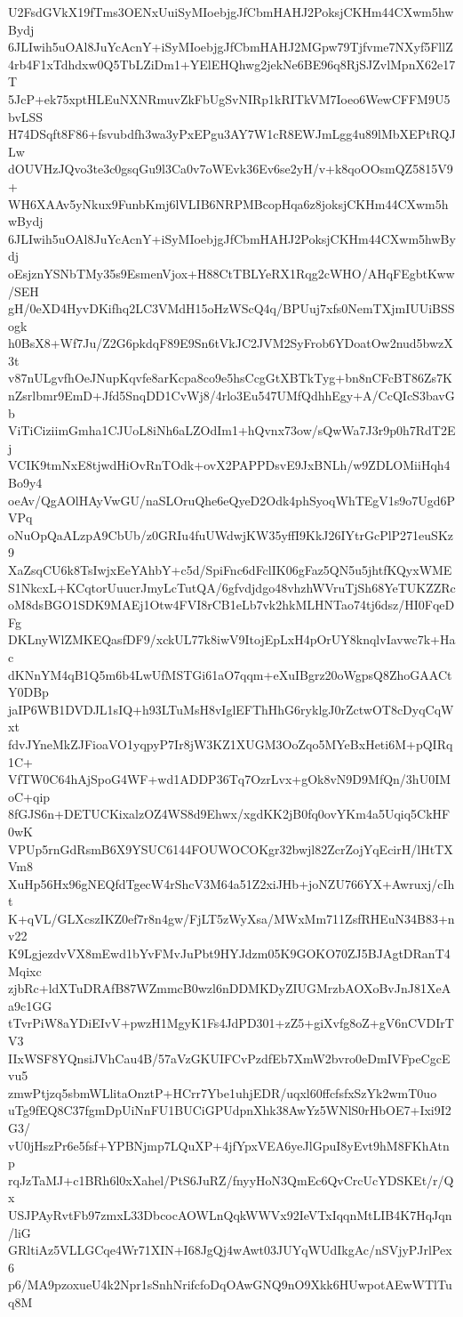 U2FsdGVkX19fTms3OENxUuiSyMIoebjgJfCbmHAHJ2PoksjCKHm44CXwm5hwBydj
6JLIwih5uOAl8JuYcAcnY+iSyMIoebjgJfCbmHAHJ2MGpw79Tjfvme7NXyf5FllZ
4rb4F1xTdhdxw0Q5TbLZiDm1+YElEHQhwg2jekNe6BE96q8RjSJZvlMpnX62e17T
5JcP+ek75xptHLEuNXNRmuvZkFbUgSvNIRp1kRITkVM7Ioeo6WewCFFM9U5bvLSS
H74DSqft8F86+fsvubdfh3wa3yPxEPgu3AY7W1cR8EWJmLgg4u89lMbXEPtRQJLw
dOUVHzJQvo3te3c0gsqGu9l3Ca0v7oWEvk36Ev6se2yH/v+k8qoOOsmQZ5815V9+
WH6XAAv5yNkux9FunbKmj6lVLIB6NRPMBcopHqa6z8joksjCKHm44CXwm5hwBydj
6JLIwih5uOAl8JuYcAcnY+iSyMIoebjgJfCbmHAHJ2PoksjCKHm44CXwm5hwBydj
oEsjznYSNbTMy35s9EsmenVjox+H88CtTBLYeRX1Rqg2cWHO/AHqFEgbtKww/SEH
gH/0eXD4HyvDKifhq2LC3VMdH15oHzWScQ4q/BPUuj7xfs0NemTXjmIUUiBSSogk
h0BsX8+Wf7Ju/Z2G6pkdqF89E9Sn6tVkJC2JVM2SyFrob6YDoatOw2nud5bwzX3t
v87nULgvfhOeJNupKqvfe8arKcpa8co9e5hsCcgGtXBTkTyg+bn8nCFcBT86Zs7K
nZsrlbmr9EmD+Jfd5SnqDD1CvWj8/4rlo3Eu547UMfQdhhEgy+A/CcQIcS3bavGb
ViTiCiziimGmha1CJUoL8iNh6aLZOdIm1+hQvnx73ow/sQwWa7J3r9p0h7RdT2Ej
VCIK9tmNxE8tjwdHiOvRnTOdk+ovX2PAPPDsvE9JxBNLh/w9ZDLOMiiHqh4Bo9y4
oeAv/QgAOlHAyVwGU/naSLOruQhe6eQyeD2Odk4phSyoqWhTEgV1s9o7Ugd6PVPq
oNuOpQaALzpA9CbUb/z0GRIu4fuUWdwjKW35yffI9KkJ26IYtrGcPlP271euSKz9
XaZsqCU6k8TsIwjxEeYAhbY+c5d/SpiFnc6dFclIK06gFaz5QN5u5jhtfKQyxWME
S1NkcxL+KCqtorUuucrJmyLcTutQA/6gfvdjdgo48vhzhWVruTjSh68YeTUKZZRc
oM8dsBGO1SDK9MAEj1Otw4FVI8rCB1eLb7vk2hkMLHNTao74tj6dsz/HI0FqeDFg
DKLnyWlZMKEQasfDF9/xckUL77k8iwV9ItojEpLxH4pOrUY8knqlvIavwc7k+Hac
dKNnYM4qB1Q5m6b4LwUfMSTGi61aO7qqm+eXuIBgrz20oWgpsQ8ZhoGAACtY0DBp
jaIP6WB1DVDJL1sIQ+h93LTuMsH8vIglEFThHhG6ryklgJ0rZctwOT8cDyqCqWxt
fdvJYneMkZJFioaVO1yqpyP7Ir8jW3KZ1XUGM3OoZqo5MYeBxHeti6M+pQIRq1C+
VfTW0C64hAjSpoG4WF+wd1ADDP36Tq7OzrLvx+gOk8vN9D9MfQn/3hU0IMoC+qip
8fGJS6n+DETUCKixalzOZ4WS8d9Ehwx/xgdKK2jB0fq0ovYKm4a5Uqiq5CkHF0wK
VPUp5rnGdRsmB6X9YSUC6144FOUWOCOKgr32bwjl82ZcrZojYqEcirH/lHtTXVm8
XuHp56Hx96gNEQfdTgecW4rShcV3M64a51Z2xiJHb+joNZU766YX+Awruxj/cIht
K+qVL/GLXcszIKZ0ef7r8n4gw/FjLT5zWyXsa/MWxMm711ZsfRHEuN34B83+nv22
K9LgjezdvVX8mEwd1bYvFMvJuPbt9HYJdzm05K9GOKO70ZJ5BJAgtDRanT4Mqixc
zjbRc+ldXTuDRAfB87WZmmcB0wzl6nDDMKDyZIUGMrzbAOXoBvJnJ81XeAa9c1GG
tTvrPiW8aYDiEIvV+pwzH1MgyK1Fs4JdPD301+zZ5+giXvfg8oZ+gV6nCVDIrTV3
IIxWSF8YQnsiJVhCau4B/57aVzGKUIFCvPzdfEb7XmW2bvro0eDmIVFpeCgcEvu5
zmwPtjzq5sbmWLlitaOnztP+HCrr7Ybe1uhjEDR/uqxl60ffcfsfxSzYk2wmT0uo
uTg9fEQ8C37fgmDpUiNnFU1BUCiGPUdpnXhk38AwYz5WNlS0rHbOE7+Ixi9I2G3/
vU0jHszPr6e5fsf+YPBNjmp7LQuXP+4jfYpxVEA6yeJlGpuI8yEvt9hM8FKhAtnp
rqJzTaMJ+c1BRh6l0xXahel/PtS6JuRZ/fnyyHoN3QmEc6QvCrcUcYDSKEt/r/Qx
USJPAyRvtFb97zmxL33DbcocAOWLnQqkWWVx92IeVTxIqqnMtLIB4K7HqJqn/liG
GRltiAz5VLLGCqe4Wr71XIN+I68JgQj4wAwt03JUYqWUdIkgAc/nSVjyPJrlPex6
p6/MA9pzoxueU4k2Npr1sSnhNrifcfoDqOAwGNQ9nO9Xkk6HUwpotAEwWTlTuq8M

